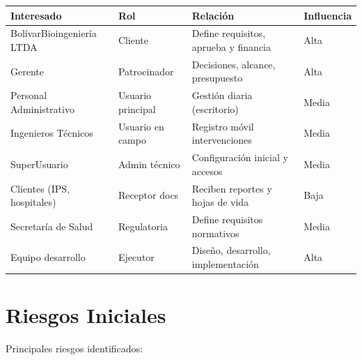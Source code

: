 \documentclass[12pt,a4paper]{article}
\begin{document}
\vspace{0.3cm}
\begin{longtable}{|L{3.0cm}|L{2.5cm}|L{4.2cm}|L{1.8cm}|}
\hline
\textbf{Interesado} & \textbf{Rol} & \textbf{Relación} & \textbf{Influencia} \\
\hline
\endhead

BolívarBioingeniería LTDA & Cliente & Define requisitos, aprueba y financia & Alta \\
\hline

Gerente & Patrocinador & Decisiones, alcance, presupuesto & Alta \\
\hline

Personal Administrativo & Usuario principal & Gestión diaria (escritorio) & Media \\
\hline

Ingenieros Técnicos & Usuario en campo & Registro móvil intervenciones & Media \\
\hline

SuperUsuario & Admin técnico & Configuración inicial y accesos & Media \\
\hline

Clientes (IPS, hospitales) & Receptor docs & Reciben reportes y hojas de vida & Baja \\
\hline

Secretaría de Salud & Regulatoria & Define requisitos normativos & Media \\
\hline

Equipo desarrollo & Ejecutor & Diseño, desarrollo, implementación & Alta \\
\hline

\end{longtable}

\section{Riesgos Iniciales}

Principales riesgos identificados:
\end{document}
